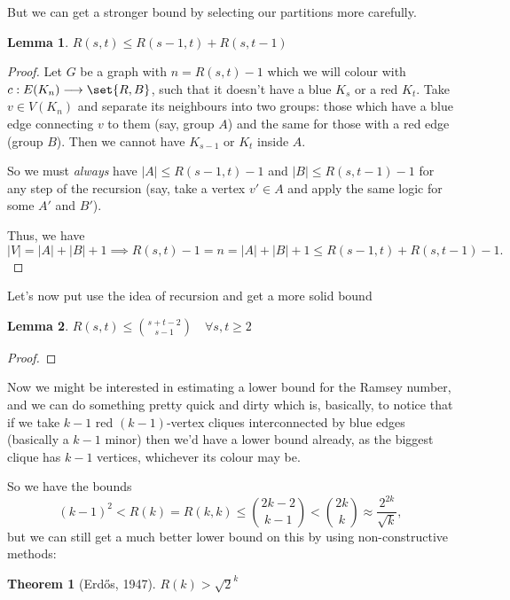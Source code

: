 \documentclass[english, dark, index]{Iart}
\newtheorem{theorem}{Theorem}[part]
\newtheorem{lemma}{Lemma}[theorem]
\begin{document}
	But we can get a stronger bound by selecting our partitions more carefully.

	\begin{lemma}
		$ R(s,t)\leqslant R(s-1,t)+R(s,t-1) $
	\end{lemma}

	\begin{proof}
		Let $ G $ be a graph with $ n=R(s,t)-1 $ which we will colour with $ c:E(K_n)\longrightarrow\set{R,B} $, such that it doesn't have a {\color{cyan}blue $ K_s $} or a {\color{red}red $ K_t $}. Take $ v\in V(K_n) $ and separate its neighbours into two groups: those which have a blue edge connecting $ v $ to them (say, group $ A $) and the same for those with a red edge (group $ B $). Then we cannot have {\color{cyan} $ K_{s-1} $} or {\color{red} $ K_t $} inside $ A $.
		
		So we must \textit{always} have $ |A|\leqslant R(s-1,t)-1 $ and $ |B|\leqslant R(s,t-1)-1 $ for any step of the recursion (say, take a vertex $ v'\in A $ and apply the same logic for some $ A' $ and $ B' $).
		
		Thus, we have
		\[ |V|=|A|+|B|+1\implies R(s,t)-1=n=|A|+|B|+1\leqslant R(s-1,t)+R(s,t-1)-1. \]
	\end{proof}
	
	Let's now put use the idea of recursion and get a more solid bound
	
	\begin{lemma}
		$ R(s,t)\leqslant \binom{s+t-2}{s-1}\quad\forall s,t\geqslant 2 $
	\end{lemma}

	\begin{proof}
	\end{proof}

	Now we might be interested in estimating a lower bound for the Ramsey number, and we can do something pretty quick and dirty which is, basically, to notice that if we take $ k-1 $ red $ (k-1) $-vertex cliques interconnected by blue edges (basically a $ k-1 $ minor) then we'd have a lower bound already, as the biggest clique has $ k-1 $ vertices, whichever its colour may be.
	
	So we have the bounds
	\[ (k-1)^{2}<R(k)=R(k,k)\leqslant \binom{2k-2}{k-1}<\binom{2k}{k}\approx \dfrac{2^{2k}}{\sqrt{k}}, \]
	but we can still get a much better lower bound on this by using non-constructive methods:
	
	\begin{theorem}[Erdős, 1947]
		$ R(k)>\sqrt{2}^{k} $
	\end{theorem}
\end{document}
